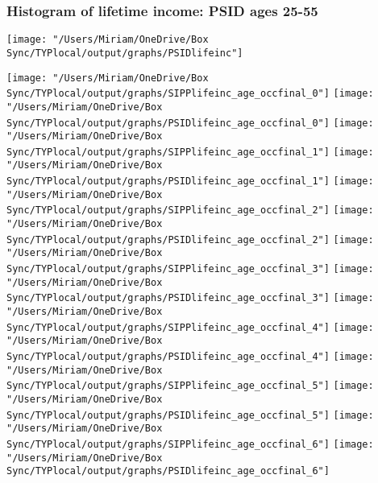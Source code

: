\documentclass[11pt]{article}
\begin{document}
\subsubsection{Histogram of lifetime income: PSID ages 25-55}
\texttt{[image: "/Users/Miriam/OneDrive/Box Sync/TYPlocal/output/graphs/PSIDlifeinc"]}

\begin{center}
\clearpage
\texttt{[image: "/Users/Miriam/OneDrive/Box Sync/TYPlocal/output/graphs/SIPPlifeinc\_age\_occfinal\_0"]}
\newline
\texttt{[image: "/Users/Miriam/OneDrive/Box Sync/TYPlocal/output/graphs/PSIDlifeinc\_age\_occfinal\_0"]}
\clearpage
\texttt{[image: "/Users/Miriam/OneDrive/Box Sync/TYPlocal/output/graphs/SIPPlifeinc\_age\_occfinal\_1"]}
\newline
\texttt{[image: "/Users/Miriam/OneDrive/Box Sync/TYPlocal/output/graphs/PSIDlifeinc\_age\_occfinal\_1"]}
\clearpage
\texttt{[image: "/Users/Miriam/OneDrive/Box Sync/TYPlocal/output/graphs/SIPPlifeinc\_age\_occfinal\_2"]}
\newline
\texttt{[image: "/Users/Miriam/OneDrive/Box Sync/TYPlocal/output/graphs/PSIDlifeinc\_age\_occfinal\_2"]}
\clearpage
\texttt{[image: "/Users/Miriam/OneDrive/Box Sync/TYPlocal/output/graphs/SIPPlifeinc\_age\_occfinal\_3"]}
\newline
\texttt{[image: "/Users/Miriam/OneDrive/Box Sync/TYPlocal/output/graphs/PSIDlifeinc\_age\_occfinal\_3"]}
\clearpage
\texttt{[image: "/Users/Miriam/OneDrive/Box Sync/TYPlocal/output/graphs/SIPPlifeinc\_age\_occfinal\_4"]}
\newline
\texttt{[image: "/Users/Miriam/OneDrive/Box Sync/TYPlocal/output/graphs/PSIDlifeinc\_age\_occfinal\_4"]}
\clearpage
\texttt{[image: "/Users/Miriam/OneDrive/Box Sync/TYPlocal/output/graphs/SIPPlifeinc\_age\_occfinal\_5"]}
\newline
\texttt{[image: "/Users/Miriam/OneDrive/Box Sync/TYPlocal/output/graphs/PSIDlifeinc\_age\_occfinal\_5"]}
\clearpage
\texttt{[image: "/Users/Miriam/OneDrive/Box Sync/TYPlocal/output/graphs/SIPPlifeinc\_age\_occfinal\_6"]}
\newline
\texttt{[image: "/Users/Miriam/OneDrive/Box Sync/TYPlocal/output/graphs/PSIDlifeinc\_age\_occfinal\_6"]}
\clearpage
\end{center}
\end{document}
